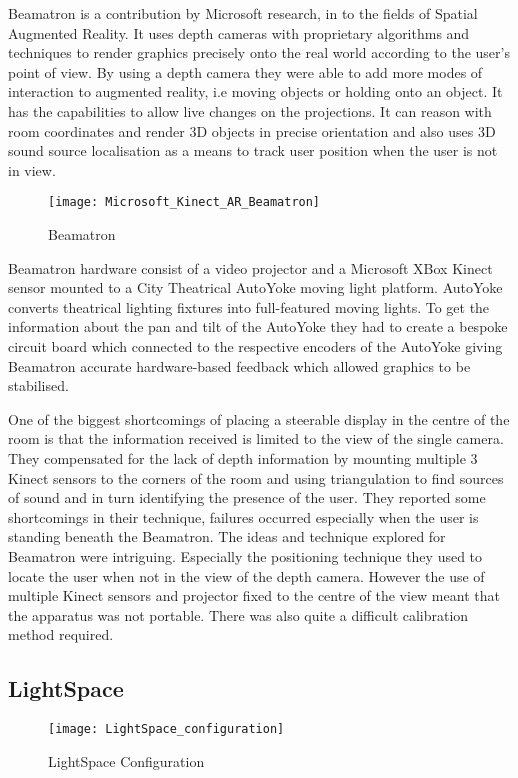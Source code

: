 Beamatron \cite{beamatron} is a contribution by Microsoft research,
in to the fields of Spatial Augmented Reality. It uses depth cameras
with proprietary algorithms and techniques to render graphics precisely
onto the real world according to the user's point of view. By using a
depth camera they were able to add more modes of interaction to augmented
reality, i.e moving objects or holding onto an object. It has the capabilities
to allow live changes on the projections. It can reason with room
coordinates and render 3D objects in precise orientation and also uses 3D
sound source localisation as a means to track user position when the
user is not in view. 
\begin{figure}
\centering
\texttt{[image: Microsoft\_Kinect\_AR\_Beamatron]}
\protect\caption{Beamatron}
\end{figure}
Beamatron hardware consist of a video projector and a Microsoft XBox
Kinect sensor mounted to a City Theatrical AutoYoke\cite{autoyoke}
moving light platform. AutoYoke converts theatrical lighting fixtures into full-featured moving lights\cite{autoyoke}. To get the information about the pan and tilt
of the AutoYoke they had to create a bespoke circuit board which connected
to the respective encoders of the AutoYoke giving Beamatron accurate
hardware-based feedback which allowed graphics to be stabilised. 

One of the biggest shortcomings of placing a steerable display in
the centre of the room is that the information received is limited
to the view of the single camera. They compensated for the lack of
depth information by mounting multiple 3 Kinect sensors to the corners
of the room and using triangulation to find sources of sound and in
turn identifying the presence of the user. They reported some shortcomings
in their technique, failures occurred especially when the user is standing beneath the
Beamatron.
The ideas and technique explored for Beamatron were intriguing. Especially
the positioning technique they used to locate the user when not in
the view of the depth camera. However the use of multiple Kinect sensors
and projector fixed to the centre of the view meant that the apparatus
was not portable. There was also quite a difficult calibration method
required.


\subsection{LightSpace}
\begin{figure}[H]
\centering
\texttt{[image: LightSpace\_configuration]}
\protect\caption{LightSpace Configuration}
\label{lightspace-config}
\end{figure}

